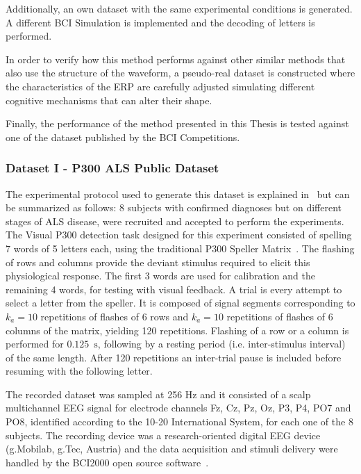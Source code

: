 Additionally, an own dataset with the same experimental conditions is generated.  A different BCI Simulation is implemented and the decoding of letters is performed. 

In order to verify how this method performs against other similar methods that also use the structure of the waveform, a pseudo-real dataset is constructed where the characteristics of the ERP are carefully adjusted simulating different cognitive mechanisms that can alter their shape.

Finally, the performance of the method presented in this Thesis is tested against one of the dataset published by the BCI Competitions. 

\subsubsection{Dataset I - P300 ALS Public Dataset} \label{ALSDataset}

The experimental protocol used to generate this dataset is explained in~\cite{Riccio2013} but can be summarized as follows:  8 subjects with confirmed diagnoses but on different stages of ALS disease, were recruited and accepted to perform the experiments. The Visual P300 detection task designed for this experiment consisted of spelling 7 words of 5 letters each, using the traditional P300 Speller Matrix~\cite{Farwell1988}. The flashing of rows and columns provide the deviant stimulus required to elicit this physiological response.  The first 3 words are used for calibration and the remaining 4 words, for testing with visual feedback.  A trial is every attempt to select a letter from the speller. It is composed of signal segments corresponding to $k_a =10$ repetitions of flashes of 6 rows and $k_a =10$ repetitions of flashes of 6 columns of the matrix, yielding 120 repetitions.  Flashing of a row or a column is performed for $0.125$~$\si{\second}$, following by a resting period (i.e. inter-stimulus interval) of the same length.  After 120 repetitions an inter-trial pause is included before resuming with the following letter.

The recorded dataset was sampled at 256 Hz and it consisted of a scalp multichannel EEG signal for electrode channels Fz, Cz, Pz, Oz, P3, P4, PO7 and PO8, identified according to the 10-20 International System,  for each one of the 8 subjects.   The recording device was a research-oriented digital EEG device (g.Mobilab, g.Tec, Austria) and the data acquisition and stimuli delivery were handled by the BCI2000 open source software~\cite{Schalk2004}.

